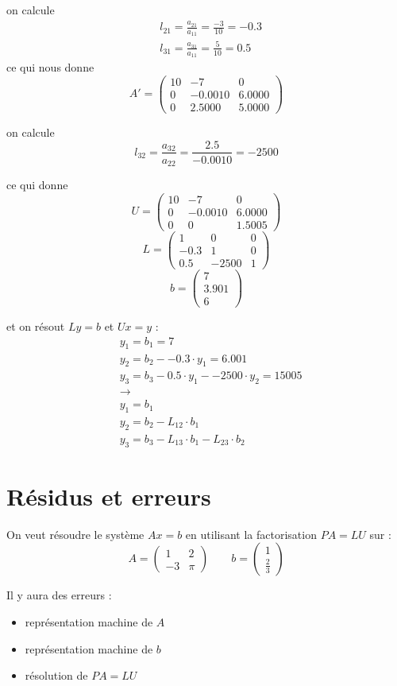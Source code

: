 \documentclass[11pt,a4paper]{report}
\newcommand{\matd}[4]{\begin{pmatrix}#1 & #2 \\ #3 & #4\end{pmatrix}}
\newcommand{\matdd}[2]{\begin{pmatrix}#1 \\ #2\end{pmatrix}}
\begin{document}
on calcule
\begin{align*}
& l_{21} = \frac{a_{21}}{a_{11}} = \frac{-3}{10} = -0.3 \\
& l_{31} = \frac{a_{31}}{a_{11}} = \frac{5}{10} = 0.5
\end{align*}
ce qui nous donne
$$
A' =
\begin{pmatrix}
10 & -7 & 0 \\
0 &  -0.0010 &   6.0000 \\
0 &   2.5000 &   5.0000
\end{pmatrix}
$$

on calcule
$$
l_{32} = \frac{a_{32}}{a_{22}} = \frac{2.5}{-0.0010} = -2500
$$

ce qui donne
$$
U =
\begin{pmatrix}
10 & -7 & 0 \\
0 &  -0.0010 &   6.0000 \\
0 & 0 & 1.5005
\end{pmatrix}
$$
$$
L = 
\begin{pmatrix}
  1  &       0   &      0 \\
  -0.3  &  1  &       0 \\
  0.5  & -2500  &  1
\end{pmatrix}
$$
$$
b =
\begin{pmatrix}
7 \\ 3.901 \\ 6
\end{pmatrix}
$$

et on résout $Ly=b$ et $Ux=y$ :
\begin{align*}
& y_1 = b_1  = 7\\
& y_2 = b_2 - -0.3 \cdot y_1 = 6.001\\
& y_3 = b_3 - 0.5 \cdot y_1 - -2500 \cdot y_2 = 15005  \\
& \rightarrow \\
& y_1 = b_1 \\
& y_2 = b_2 - L_{12} \cdot b_1 \\
& y_3 = b_3 - L_{13} \cdot b_1 - L_{23} \cdot b_2
\end{align*}

\chapter{Résidus et erreurs}
On veut résoudre le système $Ax=b$ en utilisant la factorisation $PA = LU$ sur :
$$
A = \matd{1}{2}{-3}{\pi} \qquad b = \matdd{1}{\frac{2}{3}}
$$

Il y aura des erreurs :
\begin{itemize}
   \item représentation machine de $A$
   \item représentation machine de $b$
   \item résolution de $PA = LU$
\end{itemize}
\end{document}
